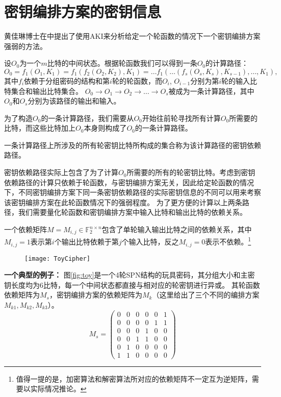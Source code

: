 \section{密钥编排方案的密钥信息}
黄佳琳博士在\cite{huang2014revisiting}中提出了使用AKI来分析给定一个轮函数的情况下一个密钥编排方案强弱的方法。
\begin{defn}[计算路径]
    设$O_0$为一个$m$比特的中间状态。根据轮函数我们可以得到一条$O_0$的计算路径：
    $$O_0=f_1(O_1,K_1)=f_1(f_2(O_2,K_2),K_1)=\dots f_1(\dots(f_s(O_s,K_s),K_{s-1}),\dots,K_1),$$
    其中$f_i$依赖于分组密码的结构和第$i$轮的轮函数，而$O_i$, $O_{i-1}$分别为第$i$轮的输入比特集合和输出比特集合。
    $O_0\rightarrow O_1\rightarrow O_2\rightarrow\dots\rightarrow O_s$被成为一条计算路径，其中$O_0$和$O_s$分别为该路径的输出和输入。
\end{defn}
为了构造$O_0$的一条计算路径，我们需要从$O_0$开始往前轮寻找所有计算$O_0$所需要的比特，而这些比特加上$O_0$本身则构成了$O_0$的一条计算路径。
\begin{defn}[密钥依赖路径]
    一条计算路径上所涉及的所有轮密钥比特所构成的集合称为该计算路径的密钥依赖路径。
\end{defn}
密钥依赖路径实际上包含了为了计算$O_0$所需要的所有的轮密钥比特。考虑到密钥依赖路径的计算只依赖于轮函数，与密钥编排方案无关，因此给定轮函数的情况下，不同密钥编排方案下同一条密钥依赖路径的实际密钥信息的不同可以用来考察该密钥编排方案在此轮函数情况下的强弱程度。
为了更方便的计算以上两条路径，我们需要量化轮函数和密钥编排方案中输入比特和输出比特的依赖关系。
\begin{defn}[依赖矩阵]
    一个依赖矩阵$M=M_{i,j}\in\mathbb{F}^{n\times n}_2$包含了单轮输入输出比特之间的依赖关系，其中$M_{i,j}=1$表示第$i$个输出比特依赖于第$j$个输入比特，反之$M_{i,j}=0$表示不依赖。\footnote{值得一提的是，加密算法和解密算法所对应的依赖矩阵不一定互为逆矩阵，需要以实际情况推论。}
\end{defn}
\begin{figure}[htbp]
\centering
    \texttt{[image: ToyCipher]}
\end{figure}
\textbf{一个典型的例子：}
图\ref{fig:toy}是一个4轮SPN结构的玩具密码，其分组大小和主密钥长度均为6比特，每一个中间状态都直接与相对应的轮密钥进行异或。
其轮函数依赖矩阵为$M_s$，密钥编排方案的依赖矩阵为$M_k$（这里给出了三个不同的编排方案$M_{k1},M_{k2},M_{k3}$）。
$$M_s=\left(
    \begin{array}{cccccc}
        0&0&0&0&0&1\\
        0&0&0&0&1&1\\
        0&0&0&1&0&0\\
        0&0&1&1&0&0\\
        0&1&0&0&0&0\\
        1&1&0&0&0&0
    \end{array}
\right)$$
